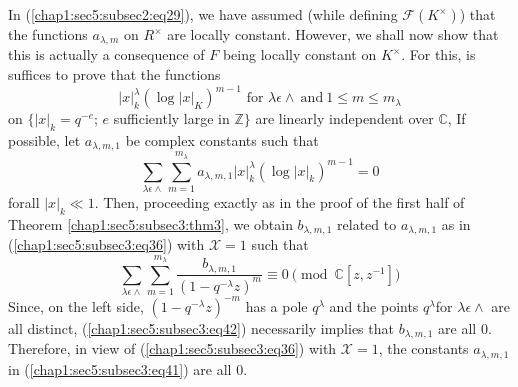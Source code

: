 \begin{remark}\label{chap1:sec5:subsec3:rem1} %
  In (\ref{chap1:sec5:subsec2:eq29}), we have assumed (while defining
  $\mathscr{F}(K^\times )$) 
  that the functions $a_{\lambda,m}$ on $R^\times $ are locally
  constant. However, we shall now show that this is actually a
  consequence of $F$ being locally constant on $K^\times $. For this,
  is suffices to prove that the functions 
  \begin{equation*}
    |x|_{k}^{\lambda}(\log |x|_{K})^{m-1} \text{ for } \lambda
    \epsilon \wedge ~\text{and}~ 1\le m\le m_{\lambda} 
  \end{equation*}
  on $\{|x|_{k}=q^{-e}$; $e$ sufficiently large in $\mathbb{Z}\}$ are
  linearly independent over $\mathbb{C}$, If possible, let
  $a_{\lambda, m, 1}$ be complex constants such that 
  \begin{equation*}
    \sum_{\lambda \epsilon \wedge}\sum_{m=1}^{m_{\lambda}}
    a_{\lambda,m,1} |x|_{k}^{\lambda}(\log|x|_{k})^{m-1}=0\tag{41} 
    \label{chap1:sec5:subsec3:eq41}
  \end{equation*}
  for\pageoriginale all $|x|_{k}\ll 1$. Then, proceeding exactly as in the proof of
  the first half of Theorem \ref{chap1:sec5:subsec3:thm3}, we obtain
  $b_{\lambda,m, 1}$ related 
  to $a_{\lambda, m, 1}$ as in (\ref{chap1:sec5:subsec3:eq36}) with $\mathcal{X}=1$ such that 
  \begin{equation*}
    \sum_{\lambda \epsilon
      \wedge}\sum_{m=1}^{m_{\lambda}}\frac{b_{\lambda,m,1}}{(1-q^{-\lambda}z)^m}\equiv
    0 \pmod{\mathbb{C}[z,z^{-1}]}\tag{42} \label{chap1:sec5:subsec3:eq42}
\end{equation*}
Since, on the left side, $(1-q^{-\lambda}z)^{-m}$ has a pole
$q^{\lambda}$ and the points $q^{\lambda}$for $\lambda \epsilon
\wedge$ are all distinct, (\ref{chap1:sec5:subsec3:eq42}) necessarily
implies that $b_{\lambda, 
  m, 1}$ are all 0. Therefore, in view of (\ref{chap1:sec5:subsec3:eq36}) with
$\mathcal{X}=1$, the constants $a_{\lambda, m,1}$ in
(\ref{chap1:sec5:subsec3:eq41})  are all 0.
\end{remark}

